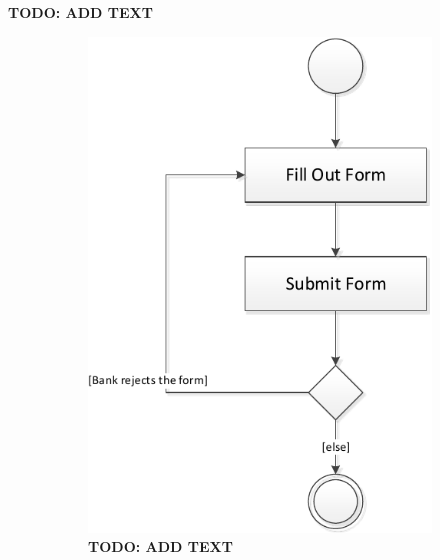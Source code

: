 \textbf{TODO: ADD TEXT}

\begin{figure} 
	\centering
	\begin{subfigure}[b]{0.3\textwidth}
	\includegraphics[width=\textwidth]{img/activity_diagrams/buy_toll_tag}
	\caption{\textbf{TODO: ADD TEXT}}
	\end{subfigure}
	~
	\begin{subfigure}[b]{0.5\textwidth}

\end{subfigure}
\end{figure}
